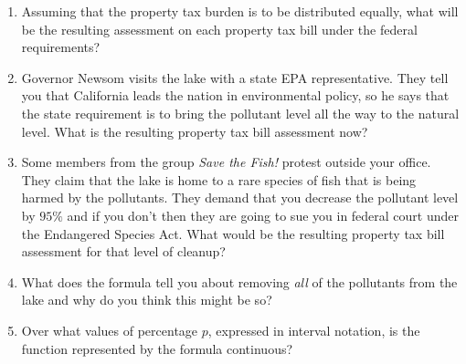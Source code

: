 \documentclass[letterpaper,12pt,fleqn]{article}
\begin{document}
\begin{enumerate}[label={(\alph*)}]
\item Assuming that the property tax burden is to be distributed equally, what will be the resulting assessment on
  each property tax bill under the federal requirements?
\item Governor Newsom visits the lake with a state EPA representative.  They tell you that California leads the
  nation in environmental policy, so he says that the state requirement is to bring the pollutant level all the way
  to the natural level.  What is the resulting property tax bill assessment now?
\item Some members from the group \emph{Save the Fish!} protest outside your office.  They claim that the lake is
  home to a rare species of fish that is being harmed by the pollutants.  They demand that you decrease the
  pollutant level by \(95\%\) and if you don't then they are going to sue you in federal court under the Endangered
  Species Act.  What would be the resulting property tax bill assessment for that level of cleanup?
\item What does the formula tell you about removing \emph{all} of the pollutants from the lake and why do you think
  this might be so?
\item Over what values of percentage \(p\), expressed in interval notation, is the function represented by the formula
  continuous?
\end{enumerate}
\end{document}
